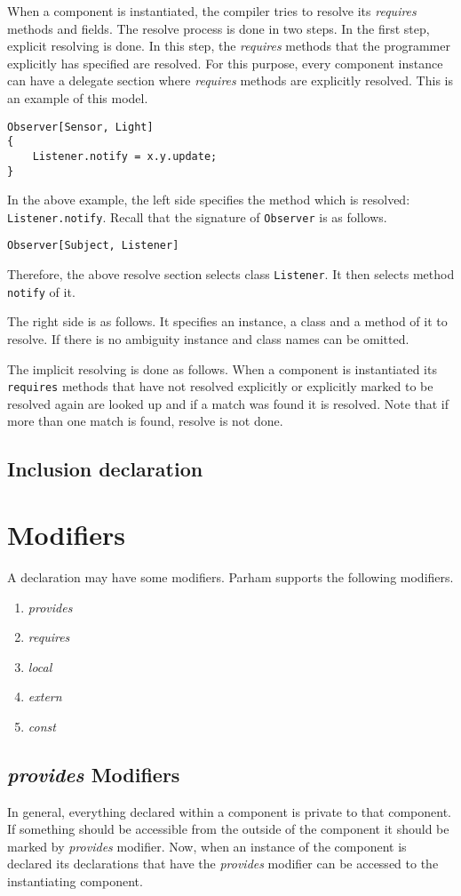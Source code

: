 \documentclass[acmsmall]{acmart}
\begin{document}
When a component is instantiated, the compiler tries to resolve its \textit{requires} methods and fields.
The resolve process is done in two steps.
In the first step, explicit resolving is done.
In this step, the \textit{requires} methods that the programmer explicitly has specified are resolved.
For this purpose, every component instance can have a delegate section where \textit{requires} methods are explicitly resolved.
This is an example of this model.
\begin{lstlisting}
Observer[Sensor, Light]
{
	Listener.notify = x.y.update;
}
\end{lstlisting}
In the above example, the left  side specifies the method which is resolved: \texttt{Listener.notify}.
Recall that the signature of \texttt{Observer} is as follows.
\begin{lstlisting}
Observer[Subject, Listener]
\end{lstlisting}
Therefore, the above resolve section selects class \texttt{Listener}.
It then selects method \texttt{notify} of it.

The right side is as follows.
It specifies an instance, a class and a method of it to resolve.
If there is no ambiguity instance and class names can be omitted.

The implicit resolving is done as follows.
When a component is instantiated its \texttt{requires} methods that have not resolved explicitly or explicitly marked to be resolved again are looked up and if a match was found it is resolved.
Note that if more than one match is found, resolve is not done.
\subsection{Inclusion declaration}

\section{Modifiers}
A declaration may have some modifiers.
Parham supports the following modifiers.
\begin{enumerate}
\item\textit{provides}
\item\textit{requires}
\item\textit{local}
\item\textit{extern}
\item\textit{const}
\end{enumerate}

\subsection{\textit{provides} Modifiers}
In general, everything declared within a component is private to that component.
If something should be accessible from the outside of the component it should be marked by \textit{provides} modifier.
Now, when an instance of the component is declared its declarations that have the \textit{provides} modifier can be accessed to the instantiating component.
\end{document}

